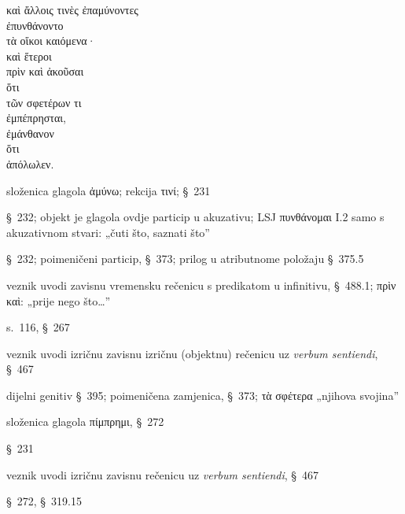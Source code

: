 {\large
\begin{greek}
\noindent καὶ ἄλλοις τινὲς ἐπαμύνοντες \\
ἐπυνθάνοντο \\
τὰ οἴκοι καιόμενα· \\
καὶ ἕτεροι \\
\tabto{2em} πρὶν καὶ ἀκοῦσαι \\
\tabto{4em} ὅτι\\
\tabto{6em} τῶν σφετέρων τι \\
\tabto{4em} ἐμπέπρησται, \\

ἐμάνθανον \\
\tabto{2em} ὅτι \\
\tabto{4em} ἀπόλωλεν. \\


\end{greek}
}

\begin{description}[noitemsep,topsep=0.5em]
\item[ἐπαμύνοντες] složenica glagola \textgreek[variant=ancient]{ἀμύνω;} rekcija τινί; §~231
\item[ἐπυνθάνοντο] §~232; objekt je glagola ovdje particip u akuzativu; LSJ \textgreek[variant=ancient]{πυνθάνομαι} I.2 samo s akuzativnom stvari: „čuti što, saznati što”
\item[τὰ οἴκοι καιόμενα] §~232; poimeničeni particip, §~373; prilog u atributnome položaju §~375.5
\item[πρὶν] veznik uvodi zavisnu vremensku rečenicu s predikatom u infinitivu, §~488.1; πρὶν καὶ: „prije nego što\dots”
\item[ἀκοῦσαι] s.~116, §~267
\item[ὅτι] veznik uvodi izričnu zavisnu izričnu (objektnu) rečenicu uz \textit{verbum sentiendi}, §~467
\item[τῶν σφετέρων] dijelni genitiv §~395; poimeničena zamjenica, §~373; τὰ σφέτερα „njihova svojina”
\item[ἐμπέπρησται] složenica glagola \textgreek[variant=ancient]{πίμπρημι,} §~272
\item[ἐμάνθανον] §~231
\item[ὅτι] veznik uvodi izričnu zavisnu rečenicu uz \textit{verbum sentiendi}, §~467
\item[ἀπόλωλεν] §~272, §~319.15

\end{description}

\bigskip



